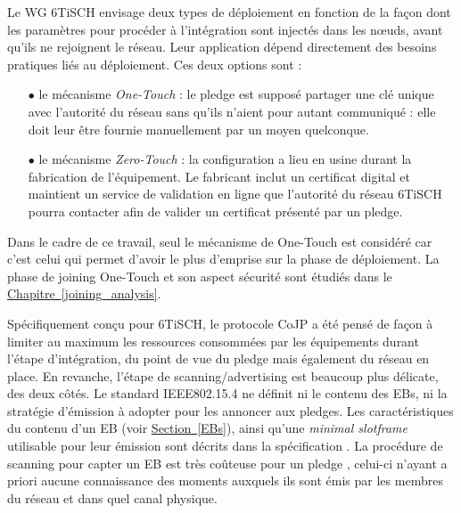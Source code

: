 \documentclass[]{report}
\newcommand{\wordlink}[2]{\hyperref[#2]{#1~\ref{#2}}}
\begin{document}
\vspace{0.5cm}

\par Le WG 6TiSCH envisage deux types de déploiement en fonction de la façon dont les paramètres pour procéder à l'intégration sont injectés dans les nœuds, avant qu'ils ne rejoignent le réseau. Leur application dépend directement des besoins pratiques liés au déploiement. Ces deux options sont \cite{6TiSCH-industrial-perf} :

\begin{itemize}
\item[$\bullet$] le mécanisme \textit{One-Touch} : le pledge est supposé partager une clé unique avec l'autorité du réseau sans qu'ils n'aient pour autant communiqué : elle doit leur être fournie manuellement par un moyen quelconque.
\item[$\bullet$] le mécanisme \textit{Zero-Touch} : la configuration a lieu en usine durant la fabrication de l'équipement. Le fabricant inclut un certificat digital et maintient un service de validation en ligne que l'autorité du réseau 6TiSCH pourra contacter afin de valider un certificat présenté par un pledge.
\end{itemize}

\vspace{0.1cm}

\noindent Dans le cadre de ce travail, seul le mécanisme de One-Touch est considéré car c'est celui qui permet d'avoir le plus d'emprise sur la phase de déploiement. La phase de joining One-Touch et son aspect sécurité sont étudiés dans le \wordlink{Chapitre}{joining_analysis}.\\

\par Spécifiquement conçu pour 6TiSCH, le protocole CoJP a été pensé de façon à limiter au maximum les ressources consommées par les équipements durant l'étape d'intégration, du point de vue du pledge mais également du réseau en place. En revanche, l'étape de scanning/advertising est beaucoup plus délicate, des deux côtés. Le standard IEEE802.15.4 \cite{IEEE802.15.4} ne définit ni le contenu des EBs, ni la stratégie d'émission à adopter pour les annoncer aux pledges. Les caractéristiques du contenu d'un EB (voir \wordlink{Section}{EBs}), ainsi qu'une \textit{minimal slotframe} utilisable pour leur émission sont décrits dans la spécification \cite{rfc8180}. La procédure de scanning pour capter un EB est très coûteuse pour un pledge \cite{join-TSCH-RPL}, celui-ci n'ayant a priori aucune connaissance des moments auxquels ils sont émis par les membres du réseau et dans quel canal physique.\\
\end{document}

